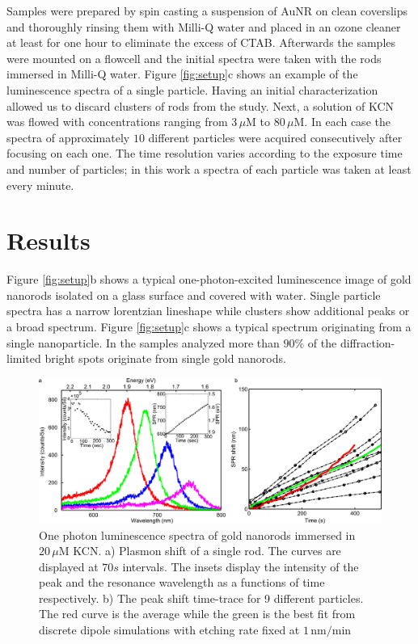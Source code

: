 \documentclass[a4paper,oneside,onecolumn]{article}
\newcommand{\nm}{\ensuremath{\,\textrm{nm}}}
\newcommand{\uM}{\ensuremath{\,\mu\textrm{M}}}
\begin{document}
Samples were prepared by spin casting a suspension of AuNR on clean
coverslips and thoroughly rinsing them with Milli-Q water and placed in an
ozone cleaner at least for one hour to eliminate the excess of CTAB. Afterwards the samples were
mounted on a flowcell and the initial spectra were taken with the rods immersed in
Milli-Q water. Figure \ref{fig:setup}c shows an example of the luminescence spectra of a single particle. Having an initial
characterization allowed us to discard clusters of rods\cite{Funston2009} from the study.
Next, a solution of KCN was flowed with concentrations ranging
from $3\uM$ to $80\uM$. In each case the spectra of approximately $10$
different particles were acquired consecutively after focusing on each one. The
time resolution varies according to the exposure time and number of particles;
in this work a spectra of each particle was taken at least every minute.

\section{Results}

Figure \ref{fig:setup}b shows a typical one-photon-excited luminescence image
of gold nanorods isolated on a glass surface and covered with water. Single particle spectra has a narrow lorentzian lineshape\cite{Funston2009} while clusters show additional peaks or a broad spectrum. Figure \ref{fig:setup}c shows a typical spectrum originating from a single nanoparticle. In the samples analyzed more than $90\%$ of the diffraction-limited bright spots originate from single gold nanorods.

\begin{figure}[p]
 \centering
 \includegraphics[width=0.95\linewidth]{Figures/02_Experimental/Experimental.png}
 \caption{One photon luminescence spectra of gold nanorods immersed in $20\uM$
 KCN. a) Plasmon shift of a single rod. The curves are displayed at $70s$
 intervals. The insets display the intensity of the peak and the resonance
 wavelength as a functions of time respectively. b) The peak shift time-trace
 for 9 different particles. The red curve is the average while the green is the
 best fit from discrete dipole simulations with etching rate fixed at
 $1\nm/\textrm{min}$}
 \label{fig:plasmon_single_rod}
\end{figure}
\end{document}
